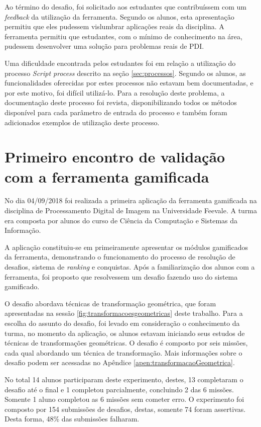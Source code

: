 \documentclass[
	12pt,				%
	oneside,			%
	a4paper,			%
	english,			%
	french,				%
	spanish,			%
	brazil,				%
	]{abntex2}
\begin{document}
Ao término do desafio, foi solicitado aos estudantes que contribuíssem com um \textit{feedback} da utilização da ferramenta. Segundo os alunos, esta apresentação permitiu que eles pudessem vislumbrar aplicações reais da disciplina. A ferramenta permitiu que estudantes, com o mínimo de conhecimento na área, pudessem desenvolver uma solução para problemas reais de PDI.

Uma dificuldade encontrada pelos estudantes foi em relação a utilização do processo \textit{Script process} descrito na seção \ref{sec:processos}. Segundo os alunos, as funcionalidades oferecidas por estes processos não estavam bem documentadas, e por este motivo, foi difícil utilizá-lo. Para a resolução deste problema, a documentação deste processo foi revista, disponibilizando todos os métodos disponível para cada parâmetro de entrada do processo e também foram adicionados exemplos de utilização deste processo.

\section{Primeiro encontro de validação com a ferramenta gamificada}

No dia 04/09/2018 foi realizada a primeira aplicação da ferramenta gamificada na disciplina de Processamento Digital de Imagem na Universidade Feevale. A turma era composta por alunos do curso de Ciência da Computação e Sistemas da Informação.

A aplicação constituiu-se em primeiramente apresentar os módulos gamificados da ferramenta, demonstrando o funcionamento do processo de resolução de desafios, sistema de \textit{ranking} e conquistas. Após a familiarização dos alunos com a ferramenta, foi proposto que resolvessem um desafio fazendo uso do sistema gamificado.

O desafio abordava técnicas de transformação geométrica, que foram apresentadas na sessão \ref{fig:transformacoesgeometricas} deste trabalho. Para a escolha do assunto do desafio, foi levado em consideração o conhecimento da turma, no momento da aplicação, os alunos estavam iniciando seus estudos de técnicas de transformações geométricas. O desafio é composto por seis missões, cada qual abordando um técnica de transformação. Mais informações sobre o desafio podem ser acessadas no Apêndice \ref{apen:transformacaoGeometrica}.

No total 14 alunos participaram deste experimento, destes, 13 completaram o desafio até o final e 1 completou parcialmente, concluindo 2 das 6 missões. Somente 1 aluno completou as 6 missões sem cometer erro. O experimento foi composto por 154 submissões de desafios, destas, somente 74 foram assertivas. Desta forma, 48\% das submissões falharam.
\end{document}
